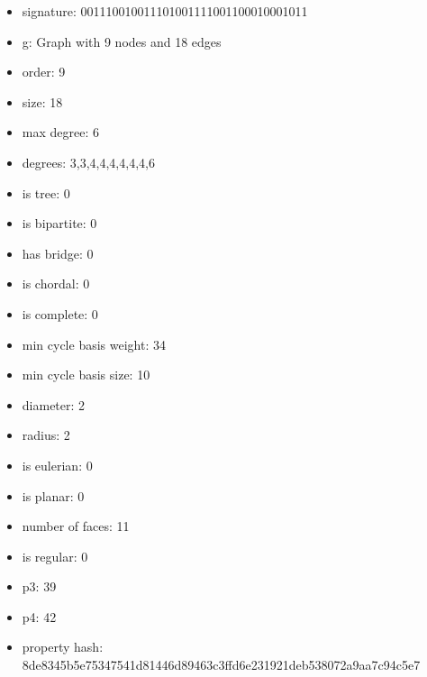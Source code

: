 \newpage
\begin{figure}
\end{figure}
\begin{itemize}
\item signature: 001110010011101001111001100010001011
\item g: Graph with 9 nodes and 18 edges
\item order: 9
\item size: 18
\item max degree: 6
\item degrees: 3,3,4,4,4,4,4,4,6
\item is tree: 0
\item is bipartite: 0
\item has bridge: 0
\item is chordal: 0
\item is complete: 0
\item min cycle basis weight: 34
\item min cycle basis size: 10
\item diameter: 2
\item radius: 2
\item is eulerian: 0
\item is planar: 0
\item number of faces: 11
\item is regular: 0
\item p3: 39
\item p4: 42
\item property hash: 8de8345b5e75347541d81446d89463c3ffd6e231921deb538072a9aa7c94c5e7
\end{itemize}
